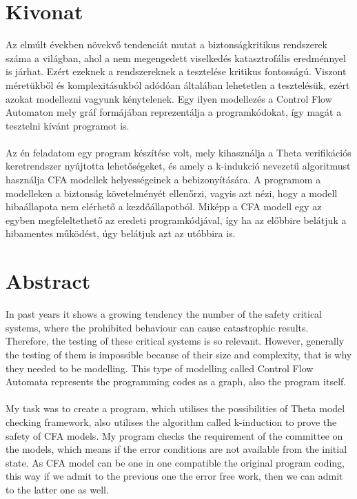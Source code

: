 \setcounter{page}{1}

\selecthungarian

\chapter*{Kivonat}

Az elmúlt években növekvő tendenciát mutat a biztonságkritikus rendszerek száma a világban, ahol a nem megengedett viselkedés katasztrofális eredménnyel is járhat. Ezért ezeknek a rendszereknek a tesztelése kritikus fontosságú. Viszont méretükből és komplexitásukból adódóan általában lehetetlen a tesztelésük, ezért azokat modellezni vagyunk kénytelenek. Egy ilyen modellezés a Control Flow Automaton mely gráf formájában reprezentálja a programkódokat, így magát a tesztelni kívánt programot is.
\\
\\
Az én feladatom egy program készítése volt, mely kihasználja a Theta verifikációs keretrendszer nyújtotta lehetőségeket, és amely a k-indukció nevezetű algoritmust használja CFA modellek helyességeinek a bebizonyítására. A programom a modelleken a biztonság követelményét ellenőrzi, vagyis azt nézi, hogy a modell hibaállapota nem elérhető a kezdőállapotból. Miképp a CFA modell egy az egyben megfeleltethető az eredeti programkódjával, így ha az előbbire belátjuk a hibamentes működést, úgy belátjuk azt az utóbbira is.

\vfill
\selectenglish


\chapter*{Abstract}

In past years it shows a growing tendency the number of the safety critical systems, where the prohibited behaviour can cause catastrophic results. Therefore, the testing of these critical systems is so relevant. However, generally the testing of them is impossible because of their size and complexity, that is why they needed to be modelling. This type of modelling called Control Flow Automata represents the programming codes as a graph, also the program itself. 
\\
\\
My task was to create a program, which utilises the possibilities of Theta model checking framework, also utilises the algorithm called k-induction to prove the safety of CFA models. My program checks the requirement of the committee on the models, which means if the error conditions are not available from the initial state. As CFA model can be one in one compatible the original program coding, this way if we admit to the previous one the error free work, then we can admit to the latter one as well. 

\vfill
\cleardoublepage

\selectthesislanguage

\setcounter{romanPage}{\value{page}}
